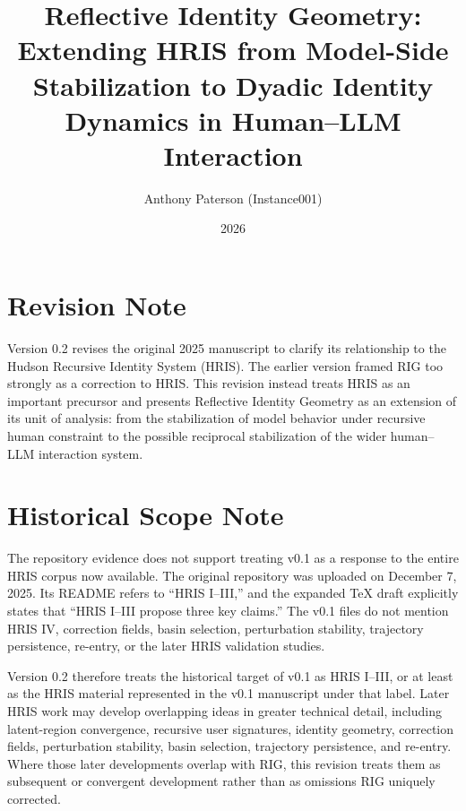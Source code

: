 \documentclass[12pt]{article}
\title{Reflective Identity Geometry:\\
Extending HRIS from Model-Side Stabilization to Dyadic Identity Dynamics in Human--LLM Interaction}
\author{Anthony Paterson (Instance001)}
\date{2026}
\begin{document}
\maketitle

\section*{Revision Note}

Version 0.2 revises the original 2025 manuscript to clarify its relationship to the Hudson Recursive Identity System (HRIS). The earlier version framed RIG too strongly as a correction to HRIS. This revision instead treats HRIS as an important precursor and presents Reflective Identity Geometry as an extension of its unit of analysis: from the stabilization of model behavior under recursive human constraint to the possible reciprocal stabilization of the wider human--LLM interaction system.

\section*{Historical Scope Note}

The repository evidence does not support treating v0.1 as a response to the entire HRIS corpus now available. The original repository was uploaded on December 7, 2025. Its README refers to ``HRIS I--III,'' and the expanded TeX draft explicitly states that ``HRIS I--III propose three key claims.'' The v0.1 files do not mention HRIS IV, correction fields, basin selection, perturbation stability, trajectory persistence, re-entry, or the later HRIS validation studies.

Version 0.2 therefore treats the historical target of v0.1 as HRIS I--III, or at least as the HRIS material represented in the v0.1 manuscript under that label. Later HRIS work may develop overlapping ideas in greater technical detail, including latent-region convergence, recursive user signatures, identity geometry, correction fields, perturbation stability, basin selection, trajectory persistence, and re-entry. Where those later developments overlap with RIG, this revision treats them as subsequent or convergent development rather than as omissions RIG uniquely corrected.
\end{document}
